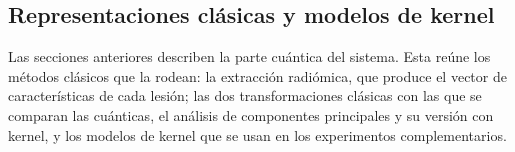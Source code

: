 
\subsection{Representaciones clásicas y modelos de kernel}
\label{sec:representaciones_clasicas}

Las secciones anteriores describen la parte cuántica del sistema. Esta reúne los métodos clásicos que la rodean: la extracción radiómica, que produce el vector de características de cada lesión; las dos transformaciones clásicas con las que se comparan las cuánticas, el análisis de componentes principales y su versión con kernel, y los modelos de kernel que se usan en los experimentos complementarios.
